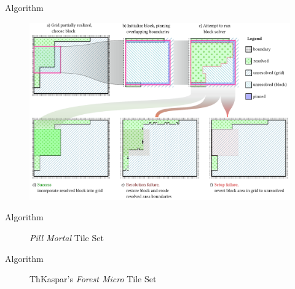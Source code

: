 \documentclass{beamer}
\begin{document}
  \begin{frame}[fragile]{Algorithm}
    \begin{figure}
      \includegraphics[width=\textwidth]{figs/poms_figalg.pdf}
    \end{figure}
  \end{frame}

  \begin{frame}[fragile]{Algorithm}
    \begin{figure}
      \textit{Pill Mortal} Tile Set

    \end{figure}
  \end{frame}

%

  \begin{frame}[fragile]{Algorithm}

    \begin{figure}
      ThKaspar's \textit{Forest Micro} Tile Set

    \end{figure}
  \end{frame}

%
\end{document}
